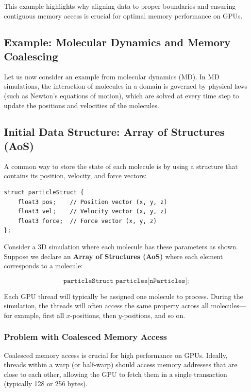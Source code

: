 \documentclass[12pt]{book}
\begin{document}
This example highlights why aligning data to proper boundaries and ensuring contiguous memory access is crucial for optimal memory performance on GPUs.

\subsection*{Example: Molecular Dynamics and Memory Coalescing}

Let us now consider an example from molecular dynamics (MD). In MD simulations, the interaction of molecules in a domain is governed by physical laws (such as Newton's equations of motion), which are solved at every time step to update the positions and velocities of the molecules.

\subsection*{Initial Data Structure: Array of Structures (AoS)}

A common way to store the state of each molecule is by using a structure that contains its position, velocity, and force vectors:

\begin{lstlisting}[style=cppstyle]
struct particleStruct {
    float3 pos;    // Position vector (x, y, z)
    float3 vel;    // Velocity vector (x, y, z)
    float3 force;  // Force vector (x, y, z)
};
\end{lstlisting}

Consider a 3D simulation where each molecule has these parameters as shown. Suppose we declare an \textbf{Array of Structures (AoS)} where each element corresponds to a molecule:

\[
\texttt{particleStruct particles[nParticles];}
\]

Each GPU thread will typically be assigned one molecule to process. During the simulation, the threads will often access the same property across all molecules---for example, first all $x$-positions, then $y$-positions, and so on.

\subsubsection*{Problem with Coalesced Memory Access}

Coalesced memory access is crucial for high performance on GPUs. Ideally, threads within a warp (or half-warp) should access memory addresses that are close to each other, allowing the GPU to fetch them in a single transaction (typically 128 or 256 bytes).
\end{document}
